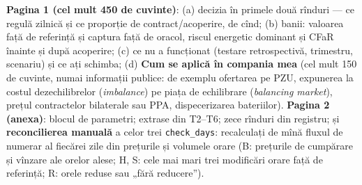 %
{\textbf{Pagina 1 (cel mult 450 de cuvinte)}: (a) decizia în primele două rînduri --- ce regulă zilnică și ce proporție de contract/acoperire, de cînd;
(b) banii: valoarea față de referință și captura față de oracol, riscul energetic dominant și CFaR înainte și după acoperire; (c) ce nu a funcționat (testare retrospectivă, trimestru, scenariu) și ce ați schimba;
(d) \textbf{Cum se aplică în compania mea} (cel mult 150 de cuvinte, numai informații publice: de exemplu ofertarea pe PZU, expunerea la costul dezechilibrelor (\emph{imbalance}) pe piața de echilibrare (\emph{balancing market}), prețul contractelor bilaterale sau PPA, dispecerizarea bateriilor).
\textbf{Pagina 2 (anexa)}: blocul de parametri; extrase din T2--T6; zece rînduri din registru; și \textbf{reconcilierea manuală} a celor trei \texttt{check\_days}: recalculați de mînă fluxul de numerar al fiecărei zile
din prețurile și volumele orare (B: prețurile de cumpărare și vînzare ale orelor alese; H, S: cele mai mari trei modificări orare față de referință; R: orele reduse sau „fără reducere'').}

